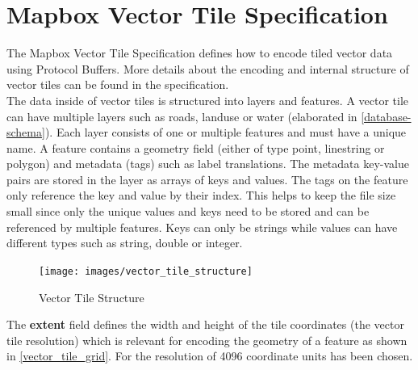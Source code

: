 \section{Mapbox Vector Tile Specification}\label{part1_vector_tile_specification}
    
The Mapbox Vector Tile Specification defines how to encode tiled vector data using Protocol Buffers\cite{protobuf_2016}. More details about the encoding and internal structure of vector tiles can be found in the specification\cite{104_mapbox.com_2016}.\\


The data inside of vector tiles is structured into layers and features. A vector tile can have multiple layers such as roads, landuse or water (elaborated in \autoref{database-schema}). Each layer consists of one or multiple features and must have a unique name. A feature contains a geometry field (either of type point, linestring or polygon) and metadata (tags) such as label translations. The metadata key-value pairs are stored in the layer as arrays of keys and values. The tags on the feature only reference the key and value by their index. This helps to keep the file size small since only the unique values and keys need to be stored and can be referenced by multiple features.
Keys can only be strings while values can have different types such as string, double or integer. 


\begin{figure}[H]
    \centering
    \texttt{[image: images/vector\_tile\_structure]}
    \caption{Vector Tile Structure}
    \label{vector_tile_structure}
\end{figure}

The \textbf{extent} field defines the width and height of the tile coordinates (the vector tile resolution) which is relevant for encoding the geometry of a feature as shown in \autoref{vector_tile_grid}. For \osmvt{} the resolution of 4096 coordinate units has been chosen.



